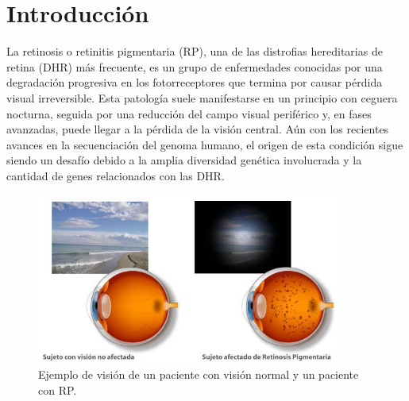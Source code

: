 \documentclass[11pt,spanish,listoffigures,listoftables]{tfgetsinf}
\begin{document}
\begin{acronym}[FASTA] %
\end{acronym}


\chapter{Introducción}

La retinosis o retinitis pigmentaria (\ac{RP}), una de las distrofias hereditarias de retina (\ac{DHR}) más frecuente, es un grupo de enfermedades conocidas por una degradación progresiva en los fotorreceptores que termina por causar pérdida visual irreversible. Esta patología suele manifestarse en un principio con ceguera nocturna, seguida por una reducción del campo visual periférico y, en fases avanzadas, puede llegar a la pérdida de la visión central\cite{NAT}. Aún con los recientes avances en la secuenciación del genoma humano, el origen de esta condición sigue siendo un desafío debido a la amplia diversidad genética involucrada y la cantidad de genes relacionados con las \ac{DHR}. 

\begin{figure}[H]
   \centering
   \includegraphics[width=0.9\textwidth]{Retinosis-Pigmetaria.jpg}
   \caption{Ejemplo de visión de un paciente con visión normal y un paciente con \ac{RP}.}
   \label{fig:etiqueta_opcional2}
\end{figure}
\end{document}
